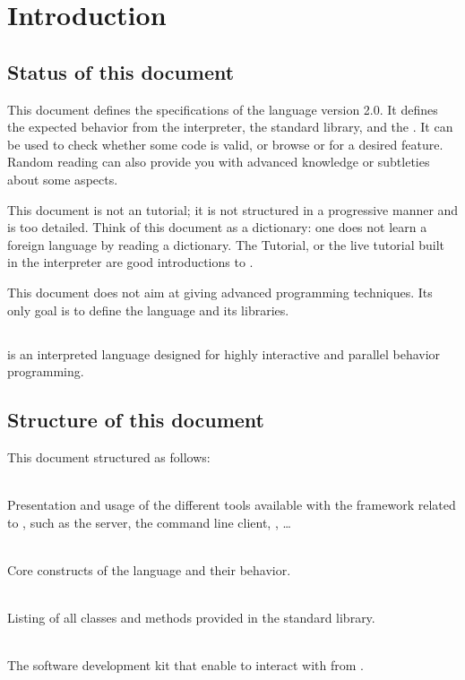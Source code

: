 \chapter*{Introduction}

\section*{Status of this document}

This document defines the specifications of the \us language version
2.0. It defines the expected behavior from the \us interpreter, the
standard library, and the \sdk. It can be used to check whether some code
is valid, or browse \us or \Cxx \api for a desired feature. Random reading
can also provide you with
advanced knowledge or subtleties about some \us aspects.

This document is not an \us tutorial; it is not structured in a
progressive manner and is too
detailed. Think of this document as a dictionary: one does not
learn a foreign language by reading a dictionary. The \us Tutorial, or
the live \us tutorial built in the interpreter are good introductions
to \us.

This document does not aim at giving advanced programming
techniques. Its only goal is to define the language and its
libraries.

\section*{\us}

\dfn[urbiscript@\us]{\us} is an interpreted language designed for highly
interactive and parallel behavior programming. %

\section*{Structure of this document}

This document structured as follows:

\begin{description}
  \newcommand{\xitem}[2]{\item[\autoref{#1} --- #2]~\\}
\xitem{sec:tools}{Tools specifications}%
  Presentation and usage of the different tools available with the
  \urbi framework related to \us, such as the \urbi server, the
  command line client, \umake, \ldots

\xitem{sec:lang}{\us language specifications}%
  Core constructs of the language and their behavior.

\xitem{sec:stdlib}{\us standard library specifications}%
  Listing of all classes and methods provided in the standard library.

\xitem{sec:sdk}{\urbi \sdk specifications}%
  The \urbi software development kit that enable to
  interact with \urbi from \Cxx.
\end{description}


\FloatBarrier

\FloatBarrier

\FloatBarrier
